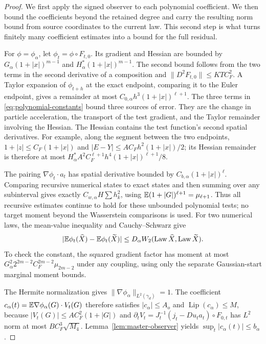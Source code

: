 \begin{proof}
We first apply the signed observer to each polynomial coefficient.
We then bound the coefficients beyond the retained degree and carry
the resulting norm bound from source coordinates to the current law.
This second step is what turns finitely many coefficient estimates into
a bound for the full residual.

For $\phi=\phi_\alpha$, let $\phi_t=\phi\circ F_{t,0}$.
Its gradient and Hessian are bounded by
$G_\alpha(1+|x|)^{m-1}$ and $H_\alpha^*(1+|x|)^{m-1}$.
The second bound follows from the two terms in the second derivative of a
composition and $\|D^2F_{t,0}\|\le KTC_F^2$.
A Taylor expansion of $\phi_{t+h}$ at the exact endpoint, comparing it to
the Euler endpoint, gives a remainder at most
$C_{0,\alpha}h^3(1+|x|)^{\ell+1}$.
The three terms in \eqref{eq:polynomial-constants} bound three sources of
error. They are the change in particle acceleration, the transport of the
test gradient, and the Taylor remainder involving the Hessian. The Hessian
contains the test function's second spatial derivatives. For
example, along the segment between the two endpoints,
$1+|z|\le C_F(1+|x|)$ and
$|E-Y|\le A C_F h^2(1+|x|)/2$; its Hessian remainder is therefore at most
$H_\alpha^*A^2C_F^{\ell+1}h^4(1+|x|)^{\ell+1}/8$.

The pairing $\nabla\phi_t\cdot a_t$ has spatial derivative bounded by
$C_{b,\alpha}(1+|x|)^\ell$. Comparing recursive numerical states to exact
states and then summing over any subinterval gives exactly
$C_{w,\alpha}H\sum h_k^2$, using
$\mathbb E(1+|G|)^{\ell+1}=\mu_{\ell+1}$. Thus all recursive estimates continue to hold
for these unbounded polynomial tests; no target moment beyond the
Wasserstein comparisons is used.
For two numerical laws, the mean-value inequality and Cauchy--Schwarz give
\[
 |\mathbb E\phi_t(\widehat X)-\mathbb E\phi_t(\widetilde X)|
 \le D_\alpha W_2(\operatorname{Law}\widehat X,\operatorname{Law}\widetilde X).
\]
To check the constant, the squared gradient factor has moment at most
$G_\alpha^2 2^{2m-2}C_F^{2m-2}\mu_{2m-2}$ under any coupling, using only
the separate Gaussian-start marginal moment bounds.

The Hermite normalization gives $\|\nabla\phi_\alpha\|_{L^2(\gamma_d)}=1$.
The coefficient
$c_\alpha(t)=\mathbb E\nabla\phi_\alpha(G)\cdot V_t(G)$ therefore satisfies
$|c_\alpha|\le A_o$ and $\operatorname{Lip}(c_\alpha)\le M$, because
$|V_t(G)|\le AC_F^2(1+|G|)$ and
$\partial_tV_t=J_t^{-1}(j_t-Du_ta_t)\circ F_{0,t}$ has $L^2$ norm at
most $BC_F^3\sqrt{M_4}$. Lemma~\ref{lem:master-observer} yields
$\sup_t|c_\alpha(t)|\le b_\alpha$.


\end{proof}
